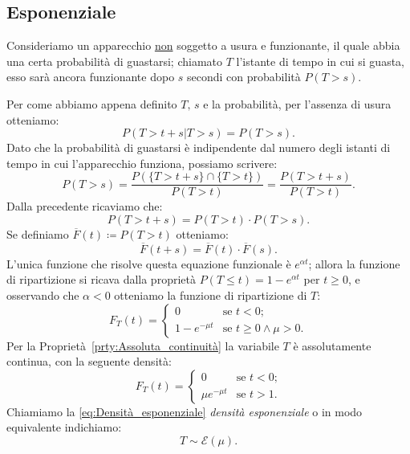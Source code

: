         \subsection{Esponenziale}
            \begin{defn}
                Consideriamo un apparecchio \underline{non} soggetto a usura e funzionante, il quale abbia una certa probabilità di guastarsi; chiamato $T$ l'istante di tempo in cui si guasta, esso sarà ancora funzionante dopo $s$ secondi con probabilità $P(T > s)$.

                Per come abbiamo appena definito $T,\,s$ e la probabilità, per l'assenza di usura otteniamo: \[
                    P(T > t + s | T > s) = P(T > s)
                .\] Dato che la probabilità di guastarsi è indipendente dal numero degli istanti di tempo in cui l'apparecchio funziona, possiamo scrivere: \[
                P(T > s) = \frac{P(\{T > t + s\} \cap \{T > t\})}{P(T > t)} = \frac{P(T > t+s)}{P(T > t)}
                .\] Dalla precedente ricaviamo che: \[
                P(T > t + s) = P(T > t) \cdot P(T > s)
            .\] Se definiamo $\overline{F}(t) \coloneqq P(T > t)$ otteniamo: \[
                \overline{F}(t + s) = \overline{F}(t) \cdot \overline{F}(s)
            .\] L'unica funzione che risolve questa equazione funzionale è $e^{\alpha t}$; allora la funzione di ripartizione si ricava dalla proprietà $P(T \leq t) = 1 - e^{\alpha t}$ per $t \geq 0$, e osservando che $\alpha < 0$ otteniamo la funzione di ripartizione di $T$: \[
            F_T(t) = \begin{cases}
                0 & \text{se $t < 0$;} \\
                1 - e^{-\mu t} & \text{se $t \geq 0 \land \mu > 0$.}
            \end{cases}
            \] Per la Proprietà~\ref{prty:Assoluta_continuità} la variabile $T$ è assolutamente continua, con la seguente densità:
            \begin{equation}\label{eq:Densità_esponenziale} 
                F_T(t) = \begin{cases}
                    0 & \text{se $t < 0$;} \\
                    \mu e^{-\mu t} & \text{se $t > 1$.}
                \end{cases}
           \end{equation}
            Chiamiamo la \eqref{eq:Densità_esponenziale} \textit{densità esponenziale} o in modo equivalente indichiamo: \[
                T \sim \mathcal{E}(\mu)
            .\]
            \end{defn}
